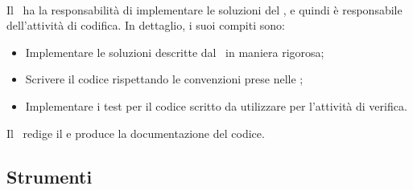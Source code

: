 \paragraph{\Progr}
Il \Progr\ ha la responsabilità di implementare le soluzioni del \Prog, e quindi è
responsabile dell'attività di codifica. In dettaglio, i suoi compiti sono:
\begin{itemize}
  \item Implementare le soluzioni descritte dal \Prog\ in maniera rigorosa;
  \item Scrivere il codice rispettando le convenzioni prese nelle \NdP;
  \item Implementare i test per il codice scritto da utilizzare per l'attività di verifica.
\end{itemize}
Il \Progr\ redige il \MU e produce la documentazione del codice.

\subsection{Strumenti}
